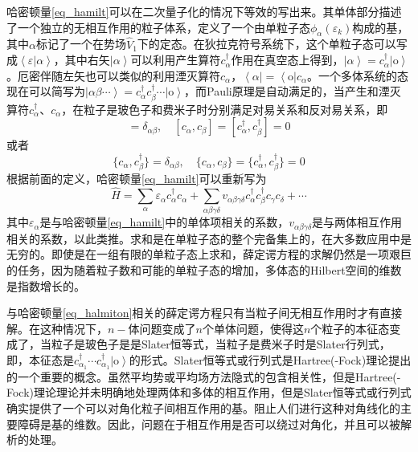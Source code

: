 哈密顿量\ref{eq_hamilt}可以在二次量子化的情况下等效的写出来。其单体部分描述了一个独立的无相互作用的粒子体系，定义了一个由单粒子态$\phi_\alpha(\varepsilon_k)$构成的基，其中$\alpha$标记了一个在势场$\hat{V}_1$下的定态。在狄拉克符号系统下，这个单粒子态可以写成$\left<\varepsilon|\alpha\right>$，其中右矢$\left|\alpha\right>$可以利用产生算符$c_\alpha^\dag$作用在真空态上得到，$\left|\alpha\right>=c_\alpha^\dag\left|\textrm{o}\right>$。厄密伴随左矢也可以类似的利用湮灭算符$c_\alpha$，$\left<\alpha\right|=\left<\textrm{o}\right|c_\alpha$。一个多体系统的态现在可以简写为$\left|\alpha\beta\cdots\right>=c_\alpha^\dag c_\beta^\dag\cdots\left|\textrm{o}\right>$，而Pauli原理是自动满足的，当产生和湮灭算符$c_\alpha^\dag$、$c_\alpha$，在粒子是玻色子和费米子时分别满足对易关系和反对易关系，即
\begin{equation*}
[c_\alpha,c_\beta^\dag]=\delta_{\alpha\beta},\quad[c_\alpha,c_\beta]=[c_\alpha^\dag,c_\beta^\dag]=0
\end{equation*}
或者
\begin{equation*}
\{c_\alpha,c_\beta^\dag\}=\delta_{\alpha\beta},\quad\{c_\alpha,c_\beta\}=\{c_\alpha^\dag,c_\beta^\dag\}=0
\end{equation*}
根据前面的定义，哈密顿量\ref{eq_hamilt}可以重新写为
\begin{equation}\label{eq_halmiton}
\hat{H}=\sum_\alpha\varepsilon_\alpha c_\alpha^\dag c_\alpha+\sum_{\alpha\beta\gamma\delta}v_{\alpha\beta\gamma\delta}c_\alpha^\dag c_\beta^\dag c_\gamma c_\delta+\cdots
\end{equation}
其中$\varepsilon_\alpha$是与哈密顿量\ref{eq_hamilt}中的单体项相关的系数，$v_{\alpha\beta\gamma\delta}$是与两体相互作用相关的系数，以此类推。求和是在单粒子态的整个完备集上的，在大多数应用中是无穷的。即使是在一组有限的单粒子态上求和，薛定谔方程的求解仍然是一项艰巨的任务，因为随着粒子数和可能的单粒子态的增加，多体态的Hilbert空间的维数是指数增长的。

与哈密顿量\ref{eq_halmiton}相关的薛定谔方程只有当粒子间无相互作用时才有直接解。在这种情况下，$n-$体问题变成了$n$个单体问题，使得这$n$个粒子的本征态变成了，当粒子是玻色子是是Slater恒等式，当粒子是费米子时是Slater行列式，即，本征态是$c_{\alpha_1}^\dag\cdots c_{\alpha_1}^\dag\left|\textrm{o}\right>$的形式。Slater恒等式或行列式是Hartree(-Fock)理论提出的一个重要的概念。虽然平均势或平均场方法隐式的包含相关性，但是Hartree(-Fock)理论理论并未明确地处理两体和多体的相互作用，但是Slater恒等式或行列式确实提供了一个可以对角化粒子间相互作用的基。阻止人们进行这种对角线化的主要障碍是基的维数。因此，问题在于相互作用是否可以绕过对角化，并且可以被解析的处理。

